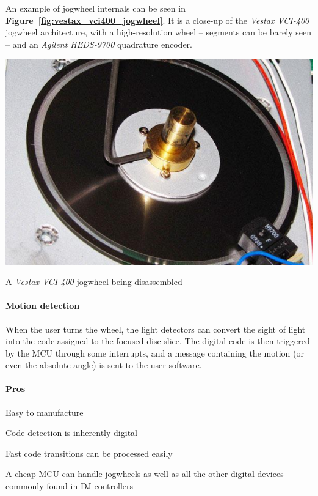 \documentclass[a4paper,10pt]{article}
\makeatletter
\newenvironment{figurehere}{\def\@captype{figure}\vspace{2ex}}{\vspace{2ex}}
\newcommand{\citef}[1]{\textbf{Figure~\ref{#1}}}
\makeatother
\begin{document}
\begin{multicols}{2}
An example of jogwheel internals can be seen in \citef{fig:vestax_vci400_jogwheel}.
It is a close-up of the \emph{Vestax VCI-400} \cite{vestax_vci400} jogwheel
architecture, with a high-resolution wheel -- segments can be barely seen --
and an \emph{Agilent HEDS-9700} quadrature encoder.

\begin{figurehere}
	\centering
	\includegraphics[keepaspectratio=true,width=0.8\columnwidth]{images/vestax_vci400_jogwheel.pdf}
	\caption{A \emph{Vestax VCI-400} jogwheel being disassembled}
	\label{fig:vestax_vci400_jogwheel}
\end{figurehere}


\paragraph{Motion detection}
When the user turns the wheel, the light detectors can convert the sight of
light into the code assigned to the focused disc slice. The digital code is
then triggered by the MCU through some interrupts, and a message containing
the motion (or even the absolute angle) is sent to the user software.


\paragraph{Pros}
\begin{itemize*}
	\item Easy to manufacture
	\item Code detection is inherently digital
	\item Fast code transitions can be processed easily
	\item A cheap MCU can handle jogwheels as well as all the other digital
		devices commonly found in DJ controllers
\end{itemize*}



\end{multicols}
\end{document}
